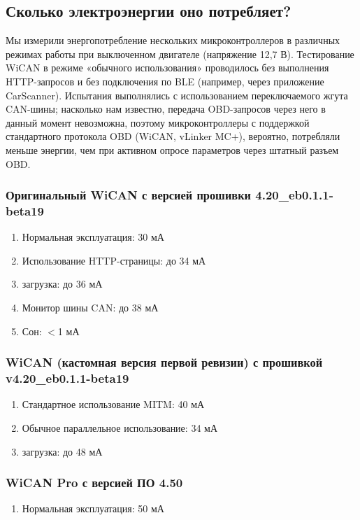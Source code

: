 \documentclass[superscriptaddress,onecolumn,floatfix]{revtex4-2}
\begin{document}
\subsection{Сколько электроэнергии оно потребляет?}

Мы измерили энергопотребление нескольких микроконтроллеров в различных режимах работы при выключенном двигателе (напряжение 12,7 В). Тестирование WiCAN в режиме «обычного использования» проводилось без выполнения HTTP-запросов и без подключения по BLE (например, через приложение CarScanner). Испытания выполнялись с использованием переключаемого жгута CAN-шины; насколько нам известно, передача OBD-запросов через него в данный момент невозможна, поэтому микроконтроллеры с поддержкой стандартного протокола OBD (WiCAN, vLinker MC+), вероятно, потребляли меньше энергии, чем при активном опросе параметров через штатный разъем OBD. 

\subsubsection{Оригинальный WiCAN с версией прошивки 4.20\_eb0.1.1-beta19}
\begin{enumerate}
  \item{Нормальная эксплуатация:} 30 мА
  \item{Использование HTTP-страницы:} до 34 мА
  \item{загрузка:} до 36 мА
  \item{Монитор шины CAN:} до 38 мА
  \item{Сон:} $<$1 мА
\end{enumerate}

\subsubsection{WiCAN (кастомная версия первой ревизии) с прошивкой v4.20\_eb0.1.1-beta19}
\begin{enumerate}
  \item{Стандартное использование MITM:} 40 мА
  \item{Обычное параллельное использование:} 34 мА
  \item{загрузка:} до 48 мА
\end{enumerate}

\subsubsection{WiCAN Pro с версией ПО 4.50}
\begin{enumerate}
  \item{Нормальная эксплуатация:} 50 мА
\end{enumerate}
\end{document}

